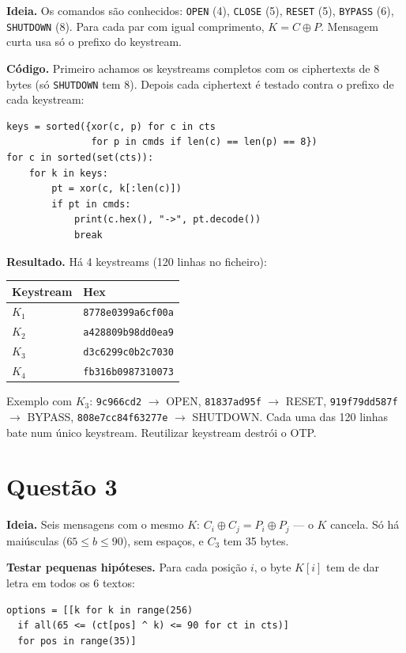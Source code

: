 \documentclass[11pt,a4paper]{article}
\begin{document}
\textbf{Ideia.} Os comandos são conhecidos: \texttt{OPEN} (4),
\texttt{CLOSE} (5), \texttt{RESET} (5), \texttt{BYPASS} (6),
\texttt{SHUTDOWN} (8). Para cada par com igual comprimento,
$K = C \oplus P$. Mensagem curta usa só o prefixo do keystream.

\textbf{Código.} Primeiro achamos os keystreams completos com os
ciphertexts de 8 bytes (só \texttt{SHUTDOWN} tem 8). Depois cada ciphertext
é testado contra o prefixo de cada keystream:

\begin{verbatim}
keys = sorted({xor(c, p) for c in cts
               for p in cmds if len(c) == len(p) == 8})
for c in sorted(set(cts)):
    for k in keys:
        pt = xor(c, k[:len(c)])
        if pt in cmds:
            print(c.hex(), "->", pt.decode())
            break
\end{verbatim}

\textbf{Resultado.} Há 4 keystreams (120 linhas no ficheiro):

\begin{center}
\begin{tabular}{ll}
\toprule
Keystream & Hex \\
\midrule
$K_1$ & \texttt{8778e0399a6cf00a} \\
$K_2$ & \texttt{a428809b98dd0ea9} \\
$K_3$ & \texttt{d3c6299c0b2c7030} \\
$K_4$ & \texttt{fb316b0987310073} \\
\bottomrule
\end{tabular}
\end{center}

Exemplo com $K_3$: \texttt{9c966cd2} $\to$ OPEN,
\texttt{81837ad95f} $\to$ RESET, \texttt{919f79dd587f} $\to$ BYPASS,
\texttt{808e7cc84f63277e} $\to$ SHUTDOWN. Cada uma das 120 linhas bate
num único keystream. Reutilizar keystream destrói o OTP.

\section*{Questão 3}

\textbf{Ideia.} Seis mensagens com o mesmo $K$:
$C_i\oplus C_j=P_i\oplus P_j$ --- o $K$ cancela. Só há maiúsculas
($65\le b\le 90$), sem espaços, e $C_3$ tem 35 bytes.

\textbf{Testar pequenas hipóteses.} Para cada posição $i$, o byte $K[i]$
tem de dar letra em todos os 6 textos:

\begin{verbatim}
options = [[k for k in range(256)
  if all(65 <= (ct[pos] ^ k) <= 90 for ct in cts)]
  for pos in range(35)]
\end{verbatim}
\end{document}
